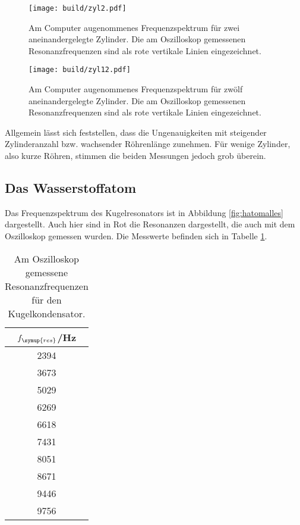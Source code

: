 \begin{figure}
  \centering
  \texttt{[image: build/zyl2.pdf]}
  \caption{Am Computer augenommenes Frequenzspektrum für zwei aneinandergelegte
  Zylinder. Die am Oszilloskop gemessenen Resonanzfrequenzen sind als rote vertikale
  Linien eingezeichnet.}
  \label{fig:zyl2}
\end{figure}
\begin{figure}
  \centering
  \texttt{[image: build/zyl12.pdf]}
  \caption{Am Computer augenommenes Frequenzspektrum für zwölf aneinandergelegte
  Zylinder. Die am Oszilloskop gemessenen Resonanzfrequenzen sind als rote vertikale
  Linien eingezeichnet.}
  \label{fig:zyl12}
\end{figure}


Allgemein lässt sich feststellen, dass die Ungenauigkeiten mit steigender Zylinderanzahl
bzw. wachsender Röhrenlänge zunehmen. Für wenige Zylinder, also kurze Röhren, stimmen
die beiden Messungen jedoch grob überein.

\newpage
\subsection{Das Wasserstoffatom}
\label{subsec:hatom}

Das Frequenzspektrum des Kugelresonators ist in Abbildung \ref{fig:hatomalles} dargestellt.
Auch hier sind in Rot die Resonanzen dargestellt, die auch mit dem Oszilloskop
gemessen wurden. Die Messwerte befinden sich in Tabelle \ref{tab:oszires}.

\begin{table}[htp]
	\begin{center}
    \caption{Am Oszilloskop gemessene Resonanzfrequenzen für den Kugelkondensator.}
		\label{tab:oszires}
		\begin{tabular}{c}
		\toprule
			{$f_\symup{res}$/Hz}\\
			\midrule
			2394\\
			3673\\
			5029\\
			6269\\
			6618\\
			7431\\
			8051\\
			8671\\
			9446\\
			9756\\
		\bottomrule
		\end{tabular}
	\end{center}
\end{table}

